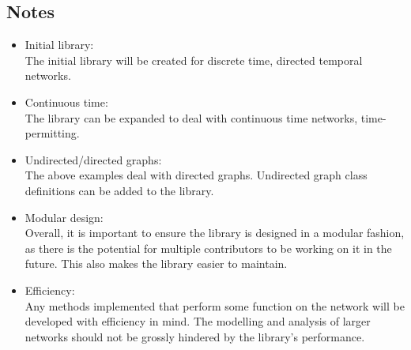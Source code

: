 \begin{design}
\subsection{Notes}
\begin{itemize}
  \item Initial library:\\
  The initial library will be created for discrete time, directed temporal networks.
  \item Continuous time:\\
  The library can be expanded to deal with continuous time networks, time-permitting.
  \item Undirected/directed graphs:\\
  The above examples deal with directed graphs. Undirected graph class definitions can be added to the library.
  \item Modular design:\\
  Overall, it is important to ensure the library is designed in a modular fashion, as there is the potential for multiple contributors to be working on it in the future. This also makes the library easier to maintain.
  \item Efficiency:\\
  Any methods implemented that perform some function on the network will be developed with efficiency in mind. The modelling and analysis of larger networks should not be grossly hindered by the library's performance.
\end{itemize}
\end{design}
\clearpage